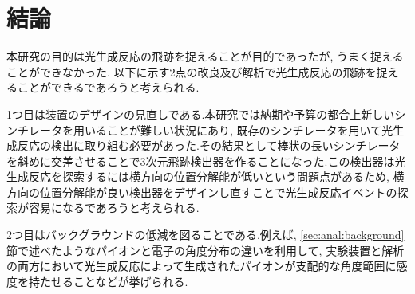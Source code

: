 \chapter{結論}\label{cha:conclusion}
本研究の目的は光生成反応の飛跡を捉えることが目的であったが, うまく捉えることができなかった.
以下に示す2点の改良及び解析で光生成反応の飛跡を捉えることができるであろうと考えられる.

1つ目は装置のデザインの見直しである.本研究では納期や予算の都合上新しいシンチレータを用いることが難しい状況にあり, 既存のシンチレータを用いて光生成反応の検出に取り組む必要があった.その結果として棒状の長いシンチレータを斜めに交差させることで3次元飛跡検出器を作ることになった.この検出器は光生成反応を探索するには横方向の位置分解能が低いという問題点があるため, 横方向の位置分解能が良い検出器をデザインし直すことで光生成反応イベントの探索が容易になるであろうと考えられる.

2つ目はバックグラウンドの低減を図ることである.例えば, \ref{sec:anal:background}節で述べたようなパイオンと電子の角度分布の違いを利用して, 実験装置と解析の両方において光生成反応によって生成されたパイオンが支配的な角度範囲に感度を持たせることなどが挙げられる.